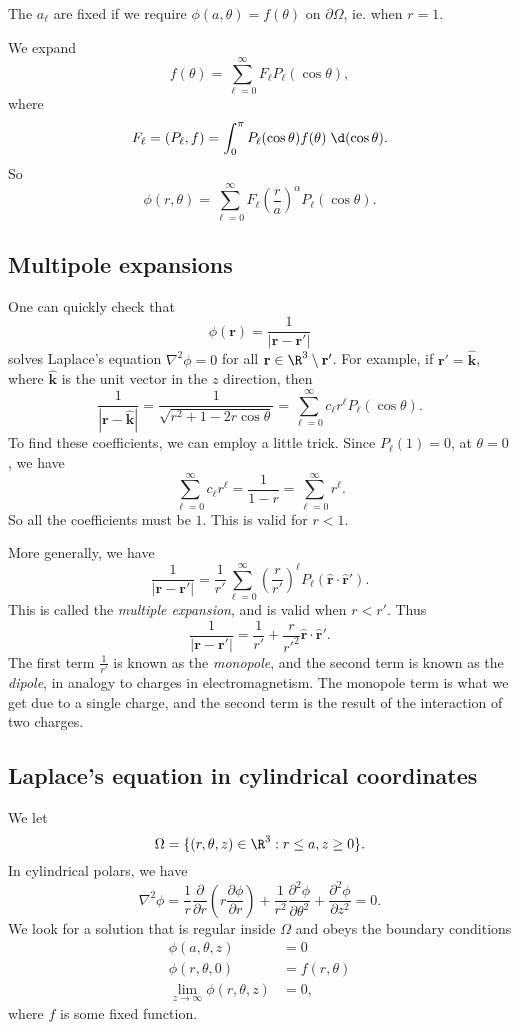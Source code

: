 \documentclass[a4paper]{article}
\begin{document}
The $a_\ell$ are fixed if we require $\phi(a, \theta) = f(\theta)$ on $\partial \Omega$, ie. when $r = 1$.

We expand
\[
  f(\theta) = \sum_{\ell = 0}^\infty F_\ell P_\ell(\cos \theta),
\]
where
\[
  F_\ell = (P_\ell, f) = \int_0^\pi P_{\ell}(\cos \theta) f(\theta) \;\d (\cos \theta).
\]
So
\[
  \phi(r, \theta) = \sum_{\ell = 0}^\infty F_\ell \left(\frac{r}{a}\right)^\alpha P_\ell(\cos \theta).
\]
\subsection{Multipole expansions}
One can quickly check that
\[
  \phi(\mathbf{r}) = \frac{1}{|\mathbf{r} - \mathbf{r}'|}
\]
solves Laplace's equation $\nabla^2 \phi = 0$ for all $\mathbf{r}\in \R^3 \setminus \mathbf{r}'$. For example, if $\mathbf{r}' = \hat{\mathbf{k}}$, where $\hat{\mathbf{k}}$ is the unit vector in the $z$ direction, then
\[
  \frac{1}{|\mathbf{r} - \hat{\mathbf{k}}|} = \frac{1}{\sqrt{r^2 + 1 - 2r \cos \theta}} = \sum_{\ell = 0}^\infty c_\ell r^\ell P_\ell(\cos \theta).
\]
To find these coefficients, we can employ a little trick. Since $P_\ell(1) = 0$, at $\theta = 0$, we have
\[
  \sum_{\ell = 0}^\infty c_\ell r^\ell = \frac{1}{1 - r} = \sum_{\ell = 0}^\infty r^\ell.
\]
So all the coefficients must be $1$. This is valid for $r < 1$.

More generally, we have
\[
  \frac{1}{|\mathbf{r} - \mathbf{r}'|} = \frac{1}{r'} \sum_{\ell = 0}^\infty \left(\frac{r}{r'}\right)^\ell P_\ell(\hat{\mathbf{r}}\cdot \hat{\mathbf{r}}').
\]
This is called the \emph{multiple expansion}, and is valid when $r < r'$. Thus
\[
  \frac{1}{|\mathbf{r} - \mathbf{r}'|} = \frac{1}{r'} + \frac{r}{r'^2}\hat{\mathbf{r}}\cdot \hat{\mathbf{r}}'.
\]
The first term $\frac{1}{r'}$ is known as the \emph{monopole}, and the second term is known as the \emph{dipole}, in analogy to charges in electromagnetism. The monopole term is what we get due to a single charge, and the second term is the result of the interaction of two charges. %

\subsection{Laplace's equation in cylindrical coordinates}
We let
\[
  \Omega = \{(r, \theta, z) \in \R^3: r \leq a, z \geq 0\}.
\]
In cylindrical polars, we have
\[
  \nabla^2 \phi = \frac{1}{r}\frac{\partial}{\partial r}\left(r \frac{\partial \phi}{\partial r}\right) + \frac{1}{r^2}\frac{\partial^2 \phi}{\partial \theta^2} + \frac{\partial^2 \phi}{\partial z^2} = 0.
\]
We look for a solution that is regular inside $\Omega$ and obeys the boundary conditions
\begin{align*}
  \phi(a, \theta, z) &= 0\\
  \phi(r, \theta, 0) &= f(r, \theta)\\
  \lim_{z\to \infty} \phi(r, \theta, z) &= 0,
\end{align*}
where $f$ is some fixed function.
\end{document}
